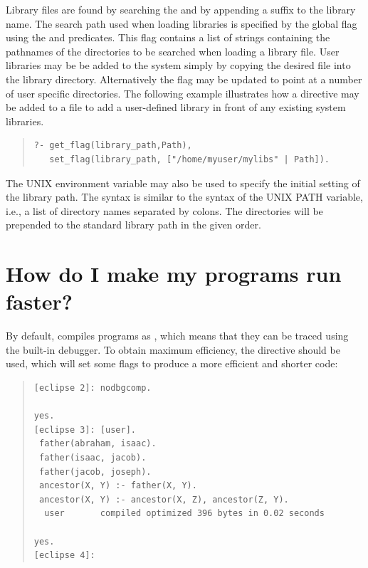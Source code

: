 Library files are found by searching the
and by appending a suffix to the library name.
The search path used when loading libraries is
specified by the global flag  using the
 and
 predicates.
This flag contains a list of strings containing the pathnames of the
directories to be searched when loading a library file.
User libraries may be be added to the system simply by copying the
desired file into the {\eclipse} library directory.
Alternatively the  flag may be updated to point
at a number of user specific directories. The following example illustrates
how a directive may be added to a file to add a user-defined library in front
of any existing system libraries.
\begin{quote}
\begin{verbatim}
?- get_flag(library_path,Path),
   set_flag(library_path, ["/home/myuser/mylibs" | Path]).
\end{verbatim}
\end{quote}
The UNIX environment variable  may also be used
to
specify the initial setting of the library path.
The syntax is similar to the syntax of the UNIX PATH variable, i.e.,
a list of directory names separated by colons.
The directories will be prepended to the standard library path in the
given order.

\section{How do I make my programs run faster?}

By default, {\eclipse} compiles programs as , which
means that they can be traced using the built-in debugger.
To obtain maximum efficiency, the directive
should be used, which will set some flags to produce a more efficient
and shorter code:
\begin{quote}
\begin{verbatim}
[eclipse 2]: nodbgcomp.

yes.
[eclipse 3]: [user].
 father(abraham, isaac).
 father(isaac, jacob).
 father(jacob, joseph).
 ancestor(X, Y) :- father(X, Y).
 ancestor(X, Y) :- ancestor(X, Z), ancestor(Z, Y).
  user       compiled optimized 396 bytes in 0.02 seconds

yes.
[eclipse 4]:
\end{verbatim}
\end{quote}

